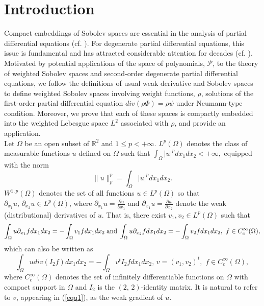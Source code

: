 \documentclass[11pt]{article}
\begin{document}
	\section{Introduction}
		Compact embeddings of Sobolev spaces are essential in
	the analysis of partial differential equations (cf. \cite{EDM}). For degenerate partial differential equations, this issue is fundamental and has attracted considerable attention for decades (cf. \cite{JH,BO,CRW, RM}). 
	Motivated by potential applications of the space of polynomials, $\mathcal{P}$, to the theory of weighted Sobolev spaces and second-order degenerate partial differential equations, we follow the definitions {\cite[Sections 1.62, 3.2(b)]{RA1}} of usual weak derivative and Sobolev spaces to define weighted Sobolev spaces involving weight functions, $\rho$, solutions of the first-order partial differential equation $div(\rho \Phi)=\rho\psi$ under Neumann-type condition. Moreover, we prove that each of  these spaces is compactly embedded into the weighted Lebesgue space $L^2$   associated with $\rho$, and provide an application. \\
	Let $\Omega$ be an open subset of $\mathbb{R}^2$ and $1\leq p< +\infty$. $L^p(\Omega)$ denotes the class of measurable functions $u$ defined on $\Omega$ such that $\int_{\Omega}|u|^pdx_1dx_2<+\infty,$ equipped with the norm 
	\begin{equation*}
		\|u\|_p^p=\int_{\Omega}|u|^pdx_1dx_2.
	\end{equation*}
	$W^{1,p}(\Omega)$ {denotes the set of all functions $u\in L^p(\Omega)$} so that $\partial_{x_1} u,\,\partial_{x_2} u\in L^p(\Omega)$, where $\partial_{x_1} u=\tfrac{\partial u}{\partial {x_1}}$ and $\partial_{x_1} u=\tfrac{\partial u}{\partial {x_2}}$ denote the weak (distributional) derivatives of $u$. That is, there exist $v_1,v_2\in L^p(\Omega)$ such that 
		\begin{equation*}
			\int_{\Omega}u\partial_{x_1} fdx_1dx_2=-\int_{\Omega} v_1fdx_1dx_2\;{\rm and}\;\int_{\Omega}u\partial_{x_2} fdx_1dx_2=-\int_{\Omega} v_2fdx_1dx_2,\,\, f\in C^{\infty}_c(\Omega),
		\end{equation*}
		which can also be written as 
		\begin{equation}\label{eqq1}
			\int_{\Omega}udiv(I_2f)dx_1dx_2=-\int_{\Omega} v^tI_2fdx_1dx_2,\,v=(v_1,v_2)^t,\,\, f\in C^{\infty}_c(\Omega),
	\end{equation}
	where $C^{\infty}_c(\Omega)$ denotes the set of infinitely differentiable functions on $\Omega$ with compact support in $\Omega$ and $I_2$ is the $(2,\,2)$-identity matrix. It is natural to refer to $v$, appearing in (\ref{eqq1}), as the weak gradient of $u$.
\end{document}
